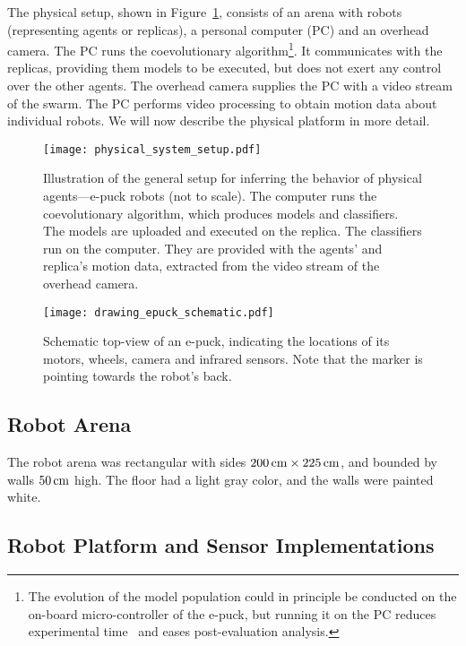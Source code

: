 The physical setup, shown in Figure~\ref{fig:physical_system_setup}, consists of an arena with robots (representing agents or replicas), a personal computer (PC) and an overhead camera. The PC runs the coevolutionary algorithm\footnote{The evolution of the model population could in principle be conducted on the on-board micro-controller of the e-puck, but running it on the PC reduces experimental time~\cite{Floreano1996} and eases post-evaluation analysis.}. It communicates with the replicas, providing them models to be executed, but does not exert any control over the other agents. The overhead camera supplies the PC with a video stream of the swarm. The PC performs video processing to obtain motion data about individual robots. We will now describe the physical platform in more detail.

\begin{figure}[!t]
    \centering
    \texttt{[image: physical\_system\_setup.pdf]}
    \caption{Illustration of the general setup for inferring the behavior of physical agents---e-puck robots (not to scale). The computer runs the coevolutionary algorithm, which produces models and classifiers. The models are uploaded and executed on the replica. The classifiers run on the computer. They are provided with the agents' and replica's motion data, extracted from the video stream of the overhead camera.}
    \label{fig:physical_system_setup}
\end{figure} 

\begin{figure}[!t]
	\centering
	\texttt{[image: drawing\_epuck\_schematic.pdf]}
	\caption{Schematic top-view of an e-puck, indicating the locations of its motors, wheels, camera and infrared sensors. Note that the marker is pointing towards the robot's back.}
	\label{fig:e_puck_schematic}
\end{figure}

\subsection{Robot Arena}\label{sec:robot_arena_physical_swarm}

The robot arena was rectangular with sides $\unit[200]{cm} \times \unit[225]{cm}$, and bounded by walls $\unit[50]{cm}$ high. The floor had a light gray color, and the walls were painted white.

\subsection{Robot Platform and Sensor Implementations}\label{sec:robot_platform_sensor_implementation}

